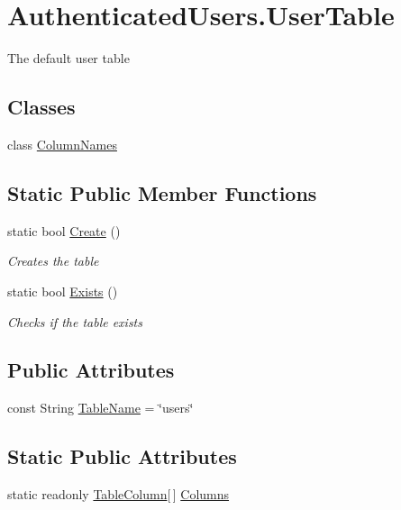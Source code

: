 \hypertarget{classOTA_1_1Data_1_1AuthenticatedUsers_1_1UserTable}{}\section{Authenticated\+Users.\+User\+Table}
\label{classOTA_1_1Data_1_1AuthenticatedUsers_1_1UserTable}


The default user table  


\subsection*{Classes}
\begin{DoxyCompactItemize}
\item 
class \hyperlink{classOTA_1_1Data_1_1AuthenticatedUsers_1_1UserTable_1_1ColumnNames}{Column\+Names}
\end{DoxyCompactItemize}
\subsection*{Static Public Member Functions}
\begin{DoxyCompactItemize}
\item 
static bool \hyperlink{classOTA_1_1Data_1_1AuthenticatedUsers_1_1UserTable_a52b70ad3b73f98d8c7d1c2fb064bd2dc}{Create} ()
\begin{DoxyCompactList}\small\item\em Creates the table \end{DoxyCompactList}\item 
static bool \hyperlink{classOTA_1_1Data_1_1AuthenticatedUsers_1_1UserTable_af9a16144d7f160f02759824d397b9916}{Exists} ()
\begin{DoxyCompactList}\small\item\em Checks if the table exists \end{DoxyCompactList}\end{DoxyCompactItemize}
\subsection*{Public Attributes}
\begin{DoxyCompactItemize}
\item 
const String \hyperlink{classOTA_1_1Data_1_1AuthenticatedUsers_1_1UserTable_a031b487979d7f51a4d54951b8fedebee}{Table\+Name} = \char`\"{}users\char`\"{}
\end{DoxyCompactItemize}
\subsection*{Static Public Attributes}
\begin{DoxyCompactItemize}
\item 
static readonly \hyperlink{structOTA_1_1Data_1_1TableColumn}{Table\+Column}\mbox{[}$\,$\mbox{]} \hyperlink{classOTA_1_1Data_1_1AuthenticatedUsers_1_1UserTable_afdedc9f90d9d4e7d2727bf6d101733bf}{Columns}
\end{DoxyCompactItemize}



